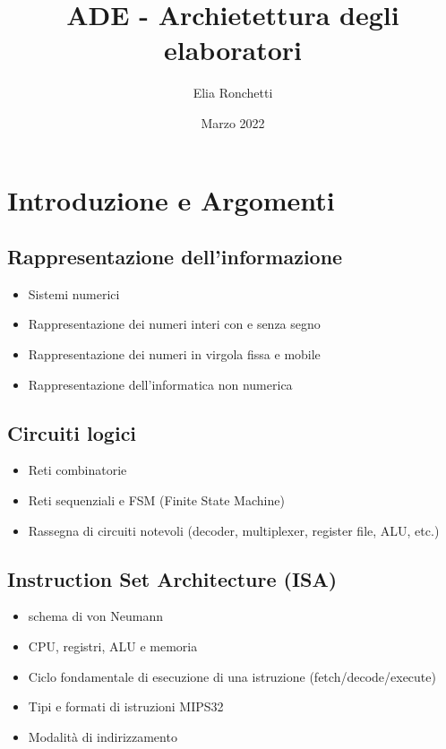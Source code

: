 \documentclass[12pt, a4paper, openany]{book}
\begin{document}
\title{ADE - Archietettura degli elaboratori}
\author{Elia Ronchetti}
\date{Marzo 2022}

\maketitle
\tableofcontents

\chapter{Introduzione e Argomenti}
\section{Rappresentazione dell'informazione}
\begin{itemize}
    \item Sistemi numerici
    \item Rappresentazione dei numeri interi con e senza segno
    \item Rappresentazione dei numeri in virgola fissa e mobile
    \item Rappresentazione dell'informatica non numerica
\end{itemize}

\section{Circuiti logici}
\begin{itemize}
    \item Reti combinatorie
    \item Reti sequenziali e FSM (Finite State Machine)
    \item Rassegna di circuiti notevoli (decoder, multiplexer, register file, ALU, etc.)
\end{itemize}

\section{Instruction Set Architecture (ISA)}
\begin{itemize}
    \item schema di von Neumann
    \item CPU, registri, ALU e memoria
    \item Ciclo fondamentale di esecuzione di una istruzione (fetch/decode/execute)
    \item Tipi e formati di istruzioni MIPS32
    \item Modalità di indirizzamento
\end{itemize}
\end{document}

